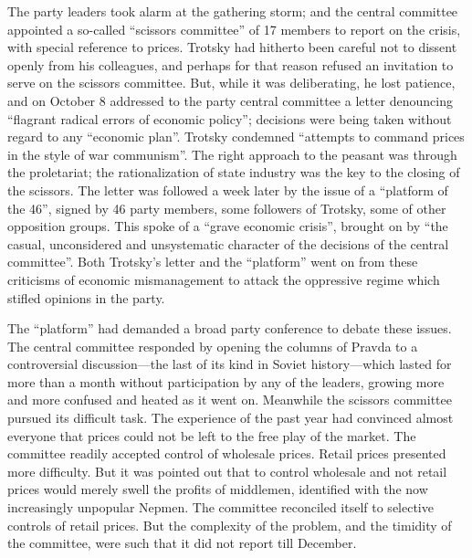 The party leaders took alarm at the gathering storm; and the central committee appointed a so-called ``scissors committee'' of 17 members to report on the crisis, with special reference to prices. Trotsky had hitherto been careful not to dissent openly from his colleagues, and perhaps for that reason refused an invitation to serve on the scissors committee. But, while it was deliberating, he lost patience, and on October 8 addressed to the party central committee a letter denouncing ``flagrant radical errors of economic policy''; decisions were being taken without regard to any ``economic plan''. Trotsky condemned ``attempts to command prices in the style of war communism''. The right approach to the peasant was through the proletariat; the rationalization of state industry was the key to the closing of the scissors. The letter was followed a week later by the issue of a ``platform of the 46'', signed by 46 party members, some followers of Trotsky, some of other opposition groups. This spoke of a ``grave economic crisis'', brought on by ``the casual, unconsidered and unsystematic character of the decisions of the central committee''. Both Trotsky's letter and the ``platform'' went on from these criticisms of economic mismanagement to attack the oppressive regime which stifled opinions in the party. 

The ``platform'' had demanded a broad party conference to debate these issues. The central committee responded by opening the columns of Pravda to a controversial discussion---the last of its kind in Soviet history---which lasted for more than a month without participation by any of the leaders, growing more and more confused and heated as it went on. Meanwhile the scissors committee pursued its difficult task. The experience of the past year had convinced almost everyone that prices could not be left to the free play of the market. The committee readily accepted control of wholesale prices. Retail prices presented more difficulty. But it was pointed out that to control wholesale and not retail prices would merely swell the profits of middlemen, identified with the now increasingly unpopular Nepmen. The committee reconciled itself to selective controls of retail prices. But the complexity of the problem, and the timidity of the committee, were such that it did not report till December. 


